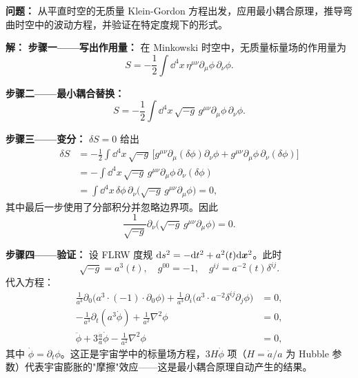 \begin{example}[从最小耦合原理推导弯曲时空标量场方程]
\textbf{问题：} 从平直时空的无质量 Klein-Gordon 方程出发，应用最小耦合原理，推导弯曲时空中的波动方程，并验证在特定度规下的形式。

\textbf{解：} 
\textbf{步骤一——写出作用量：} 在 Minkowski 时空中，无质量标量场的作用量为
\begin{equation}
    S = -\frac{1}{2} \int \dd^4 x \, \eta^{\mu\nu} \partial_\mu \phi \, \partial_\nu \phi.
\end{equation}

\textbf{步骤二——最小耦合替换：}
\begin{equation}
    S = -\frac{1}{2} \int \dd^4 x \, \sqrt{-g} \, g^{\mu\nu} \partial_\mu \phi \, \partial_\nu \phi.
\end{equation}

\textbf{步骤三——变分：} $\delta S = 0$ 给出
\begin{align}
    \delta S &= -\frac{1}{2} \int \dd^4 x \, \sqrt{-g} \, \bigl[ g^{\mu\nu} \partial_\mu(\delta\phi) \partial_\nu\phi 
               + g^{\mu\nu} \partial_\mu\phi \, \partial_\nu(\delta\phi) \bigr] \\
             &= -\int \dd^4 x \, \sqrt{-g} \, g^{\mu\nu} \partial_\mu\phi \, \partial_\nu(\delta\phi) \\
             &= \int \dd^4 x \, \delta\phi \, \partial_\nu\bigl( \sqrt{-g} \, g^{\mu\nu} \partial_\mu\phi \bigr) = 0,
\end{align}
其中最后一步使用了分部积分并忽略边界项。因此
\begin{equation}
    \frac{1}{\sqrt{-g}} \partial_\nu\bigl(\sqrt{-g}\, g^{\mu\nu} \partial_\mu\phi\bigr) = 0.
\end{equation}

\textbf{步骤四——验证：} 设 FLRW 度规 $\dd s^2 = -\dd t^2 + a^2(t) \dd \vb*{x}^2$。此时
\begin{equation}
    \sqrt{-g} = a^3(t), \quad g^{00} = -1, \quad g^{ij} = a^{-2}(t) \delta^{ij}.
\end{equation}
代入方程：
\begin{align}
    \frac{1}{a^3} \partial_0\bigl( a^3 \cdot (-1) \cdot \partial_0\phi \bigr) 
    + \frac{1}{a^3} \partial_i\bigl( a^3 \cdot a^{-2} \delta^{ij} \partial_j\phi \bigr) &= 0, \\
    -\frac{1}{a^3} \partial_t(a^3 \dot\phi) + \frac{1}{a^2} \nabla^2 \phi &= 0, \\
    \ddot\phi + 3\frac{\dot a}{a} \dot\phi - \frac{1}{a^2} \nabla^2 \phi &= 0,
\end{align}
其中 $\dot\phi = \partial_t\phi$。这正是宇宙学中的标量场方程，$3H\dot\phi$ 项（$H=\dot a/a$ 为 Hubble 参数）代表宇宙膨胀的"摩擦"效应——这是最小耦合原理自动产生的结果。
\end{example}


